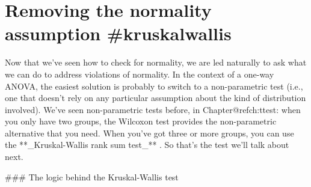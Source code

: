 \section{Removing the normality assumption {#kruskalwallis}}

Now that we've seen how to check for normality, we are led naturally to ask what we can do to address violations of normality. In the context of a one-way ANOVA, the easiest solution is probably to switch to a non-parametric test (i.e., one that doesn't rely on any particular assumption about the kind of distribution involved). We've seen non-parametric tests before, in Chapter@refch:ttest: when you only have two groups, the Wilcoxon test provides the non-parametric alternative that you need. When you've got three or more groups, you can use the **_Kruskal-Wallis rank sum test_** \cite{KruskalWallis1952}. So that's the test we'll talk about next.

### The logic behind the Kruskal-Wallis test

